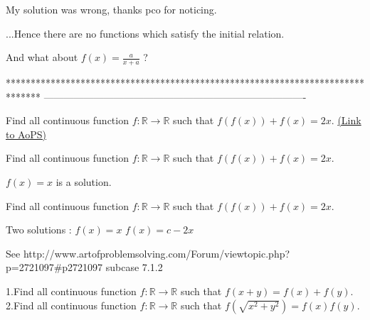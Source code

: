 \begin{solution}
	My solution was wrong, thanks pco for noticing.
\end{solution}



\begin{solution}
	\begin{tcolorbox}...Hence there are no functions which satisfy the initial relation.\end{tcolorbox}

And what about $f(x)=\frac a{x+a}$ ?
\end{solution}
*******************************************************************************
-------------------------------------------------------------------------------

\begin{problem}
	Find all continuous function $f: \mathbb{R}\to\mathbb{R}$ such that $f(f(x))+f(x)=2x$.
	\flushright \href{https://artofproblemsolving.com/community/c6h580618}{(Link to AoPS)}
\end{problem}



\begin{solution}
	\begin{tcolorbox}Find all continuous function $f: \mathbb{R}\to\mathbb{R}$ such that $f(f(x))+f(x)=2x$.\end{tcolorbox}
$f(x)=x$ is a solution.
\end{solution}



\begin{solution}
	\begin{tcolorbox}Find all continuous function $f: \mathbb{R}\to\mathbb{R}$ such that $f(f(x))+f(x)=2x$.\end{tcolorbox}
Two solutions :
$f(x)=x$
$f(x)=c-2x$

See http://www.artofproblemsolving.com/Forum/viewtopic.php?p=2721097#p2721097 subcase 7.1.2
\end{solution}



\begin{solution}
	1.Find all continuous function $f: \mathbb{R}\to\mathbb{R}$ such that $f(x+y)=f(x)+f(y)$.
2.Find all continuous function $f: \mathbb{R}\to\mathbb{R}$ such that $f(\sqrt{x^2+y^2})=f(x)f(y)$.
\end{solution}



